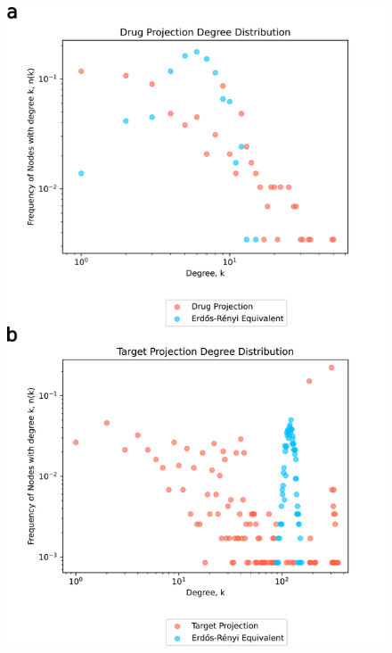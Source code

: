 \begin{appendices}
\begin{figure}[!htb]
        \includegraphics[width=(\textwidth/100)*80]{Images/Project1/SI/Figure_S1.png}
    \end{figure}


\end{appendices}
